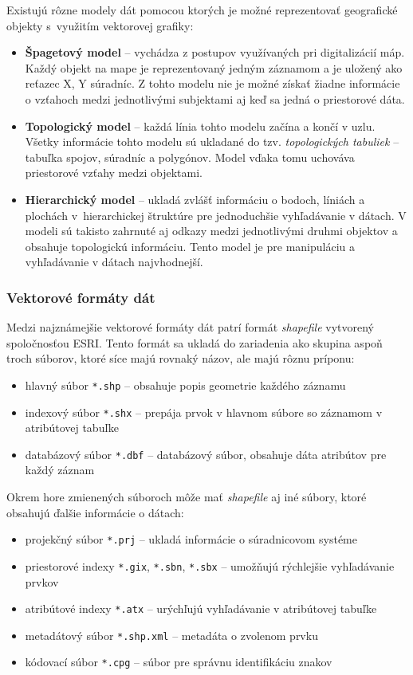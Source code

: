 Existujú rôzne modely dát pomocou ktorých je možné reprezentovať geografické objekty s~využitím vektorovej grafiky:
\begin{itemize}
    \item \textbf{Špagetový model} \--- vychádza z postupov využívaných pri digitalizácií máp. Každý objekt na mape je reprezentovaný jedným záznamom a je uložený ako reťazec X, Y súradníc. Z tohto modelu nie je možné získať žiadne informácie o vzťahoch medzi jednotlivými subjektami aj keď sa jedná o priestorové dáta.
    \item \textbf{Topologický model} \--- každá línia tohto modelu začína a končí v uzlu. Všetky informácie tohto modelu sú ukladané do tzv. \emph{topologických tabuliek} \--- tabuľka spojov, súradníc a polygónov. Model vďaka tomu uchováva priestorové vzťahy medzi objektami.
    \item \textbf{Hierarchický model} \--- ukladá zvlášť informáciu o bodoch, líniách a plochách v~hierarchickej štruktúre pre jednoduchšie vyhľadávanie v dátach. V modeli sú takisto zahrnuté aj odkazy medzi jednotlivými druhmi objektov a obsahuje topologickú informáciu. Tento model je pre manipuláciu a vyhľadávanie v dátach najvhodnejší.
\end{itemize}

\subsubsection{Vektorové formáty dát}
Medzi najznámejšie vektorové formáty dát patrí formát \emph{shapefile} vytvorený spoločnosťou ESRI. Tento formát sa ukladá do zariadenia ako skupina aspoň troch súborov, ktoré síce majú rovnaký názov, ale majú rôznu príponu:
\begin{itemize}
    \item hlavný súbor \texttt{*.shp} \--- obsahuje popis geometrie každého záznamu
    \item indexový súbor \texttt{*.shx} \--- prepája prvok v hlavnom súbore so záznamom v atribútovej tabuľke
    \item databázový súbor \texttt{*.dbf} \--- databázový súbor, obsahuje dáta atribútov pre každý záznam
\end{itemize}

Okrem hore zmienených súboroch môže mať \emph{shapefile} aj iné súbory, ktoré obsahujú ďalšie informácie o dátach:
\begin{itemize}
    \item projekčný súbor \texttt{*.prj} \--- ukladá informácie o súradnicovom systéme
    \item priestorové indexy \texttt{*.gix}, \texttt{*.sbn}, \texttt{*.sbx} \--- umožňujú rýchlejšie vyhľadávanie prvkov
    \item atribútové indexy \texttt{*.atx} \--- urýchľujú vyhľadávanie v atribútovej tabuľke
    \item metadátový súbor \texttt{*.shp.xml} \--- metadáta o zvolenom prvku
    \item kódovací súbor \texttt{*.cpg} \--- súbor pre správnu identifikáciu znakov
\end{itemize}

